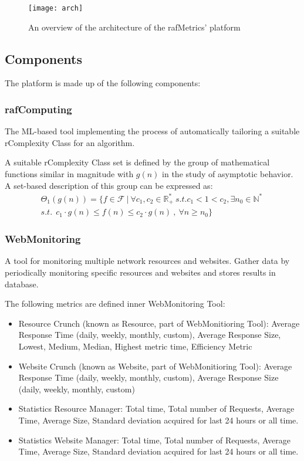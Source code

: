 \begin{figure}[H]
    \centering
    \texttt{[image: arch]}
    \caption{An overview of the architecture of the rafMetrics' platform}
\end{figure}

\subsection{Components}
The platform is made up of the following components:

\subsubsection{rafComputing}
The ML-based tool implementing the process of automatically tailoring a suitable rComplexity Class for an algorithm.


A suitable rComplexity Class set is defined by the group of mathematical functions similar in magnitude with  $g(n)$ in the study of asymptotic behavior. A set-based description of this group can be expressed as:
\[\begin{split}
      \Theta_{1}(g(n)) = \lbrace f \in \mathcal{F}\ |\ \forall c_{1}, c_{2} \in \mathbb{R}^{*}_{+} \ s.t. c_{1} < 1 < c_{2} , \exists n_{0} \in \mathbb{N}^{*}\ \\ s.t.\ \ c_{1} \cdot g(n) \leq f(n) \leq c_{2} \cdot g(n)\ ,\  \forall n \geq n_{0} \rbrace
\end{split} \]

\subsubsection{WebMonitoring}
A tool for monitoring multiple network resources and websites.
Gather data by periodically monitoring specific resources and websites and stores results in database.

The following metrics are defined inner WebMonitoring Tool:
\begin{itemize}
    \item Resource Crunch (known as Resource, part of WebMonitioring Tool): Average Response Time (daily, weekly, monthly, custom), Average Response Size, Lowest, Medium, Median, Highest metric time, Efficiency Metric
    \item Website Crunch (known as Website, part of WebMonitioring Tool): Average Response Time (daily, weekly, monthly, custom), Average Response Size (daily, weekly, monthly, custom)
    \item Statistics Resource Manager: Total time, Total number of Requests, Average Time, Average Size, Standard deviation acquired for last 24 hours or all time.
    \item Statistics Website Manager: Total time, Total number of Requests, Average Time, Average Size, Standard deviation acquired for last 24 hours or all time.
\end{itemize}


